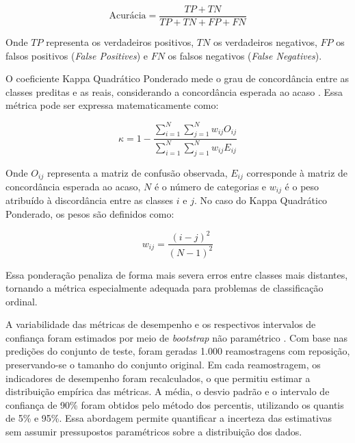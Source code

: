\begin{equation}
	\text{Acurácia} = \frac{TP + TN}{TP + TN + FP + FN}
\end{equation}

Onde \(TP\) representa os verdadeiros positivos, \(TN\) os verdadeiros negativos, \(FP\) os falsos positivos (\textit{False Positives}) e \(FN\) os falsos negativos (\textit{False Negatives}).

O coeficiente Kappa Quadrático Ponderado mede o grau de concordância entre as classes preditas e as reais, considerando a concordância esperada ao acaso \cite{ref-cohen1968}. Essa métrica pode ser expressa matematicamente como:

\begin{equation}
	\kappa = 1 - \frac{\sum_{i=1}^{N}\sum_{j=1}^{N} w_{ij} O_{ij}}
	{\sum_{i=1}^{N}\sum_{j=1}^{N} w_{ij} E_{ij}}
\end{equation}

Onde \(O_{ij}\) representa a matriz de confusão observada, \(E_{ij}\) corresponde à matriz de concordância esperada ao acaso, \(N\) é o número de categorias e \(w_{ij}\) é o peso atribuído à discordância entre as classes \(i\) e \(j\). No caso do Kappa Quadrático Ponderado, os pesos são definidos como:

\begin{equation}
	w_{ij} = \frac{(i - j)^2}{(N - 1)^2}
\end{equation}

Essa ponderação penaliza de forma mais severa erros entre classes mais distantes, tornando a métrica especialmente adequada para problemas de classificação ordinal.

A variabilidade das métricas de desempenho e os respectivos intervalos de confiança foram estimados por meio de \textit{bootstrap} não paramétrico \cite{efron1979bootstrap}. Com base nas predições do conjunto de teste, foram geradas 1.000 reamostragens com reposição, preservando-se o tamanho do conjunto original. Em cada reamostragem, os indicadores de desempenho foram recalculados, o que permitiu estimar a distribuição empírica das métricas. A média, o desvio padrão e o intervalo de confiança de 90\% foram obtidos pelo método dos percentis, utilizando os quantis de 5\% e 95\%. Essa abordagem permite quantificar a incerteza das estimativas sem assumir pressupostos paramétricos sobre a distribuição dos dados.